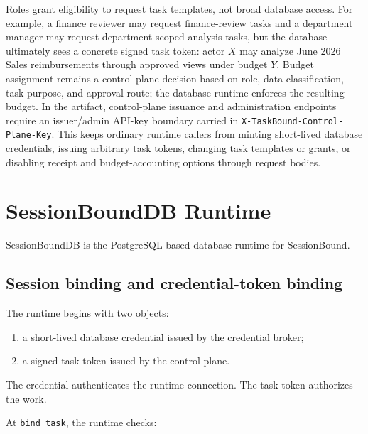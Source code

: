 \documentclass[journal]{IEEEtran}
\providecommand{\tightlist}{%
  \setlength{\itemsep}{0pt}\setlength{\parskip}{0pt}}
\begin{document}
Roles grant eligibility to request task templates, not broad database
access. For example, a finance reviewer may request finance-review
tasks and a department manager may request department-scoped analysis
tasks, but the database ultimately sees a concrete signed task token:
actor \(X\) may analyze June 2026 Sales reimbursements through approved
views under budget \(Y\). Budget assignment remains a control-plane
decision based on role, data classification, task purpose, and approval
route; the database runtime enforces the resulting budget. In the
artifact, control-plane issuance and administration endpoints require an
issuer/admin API-key boundary carried in
\texttt{X-TaskBound-Control-Plane-Key}. This keeps ordinary runtime
callers from minting short-lived database credentials, issuing arbitrary
task tokens, changing task templates or grants, or disabling receipt and
budget-accounting options through request bodies.


\hypertarget{sessionbounddb-runtime}{%
\section{SessionBoundDB Runtime}\label{sessionbounddb-runtime}}

SessionBoundDB is the PostgreSQL-based database runtime for
SessionBound.

\hypertarget{session-binding-and-credential-token-binding}{%
\subsection{Session binding and credential-token
binding}\label{session-binding-and-credential-token-binding}}

The runtime begins with two objects:

\begin{enumerate}
\def\labelenumi{\arabic{enumi}.}
\tightlist
\item
  a short-lived database credential issued by the credential broker;
\item
  a signed task token issued by the control plane.
\end{enumerate}

The credential authenticates the runtime connection. The task token
authorizes the work.

At \texttt{bind\_task}, the runtime checks:
\end{document}

